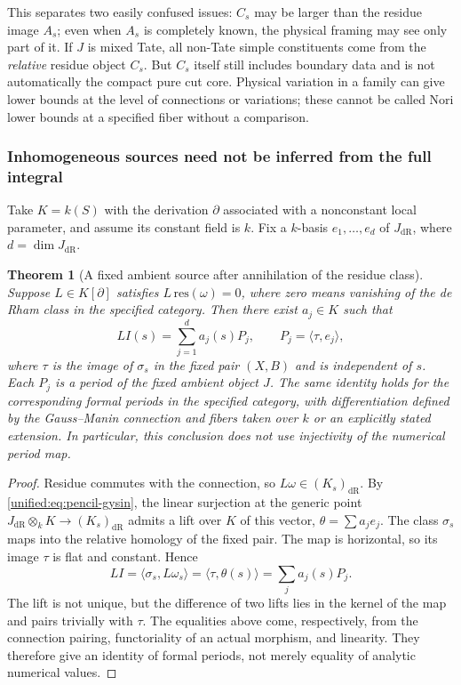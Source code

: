 \documentclass[11pt,a4paper,oneside]{article}
\theoremstyle{plain}
\newtheorem{theorem}{Theorem}[section]
\theoremstyle{definition}
\theoremstyle{remark}
\newcommand{\dR}{\mathrm{dR}}
\numberwithin{equation}{section}
\begin{document}
This separates two easily confused issues: $C_s$ may be larger than the residue image $A_s$;
even when $A_s$ is completely known, the physical framing may see only part of it.
If $J$ is mixed Tate, all non-Tate simple constituents come from the \emph{relative} residue object $C_s$.
But $C_s$ itself still includes boundary data and is not automatically the compact pure cut core.
Physical variation in a family can give lower bounds at the level of connections or variations;
these cannot be called Nori lower bounds at a specified fiber without a comparison.

\subsubsection{Inhomogeneous sources need not be inferred from the full integral}
Take $K=k(S)$ with the derivation $\partial$ associated with a nonconstant local parameter,
and assume its constant field is $k$.
Fix a $k$-basis $e_1,\ldots,e_d$ of $J_{\dR}$, where $d=\dim J_{\dR}$.

\begin{theorem}[A fixed ambient source after annihilation of the residue class]\label{unified:thm:ambient-source}
Suppose $L\in K[\partial]$ satisfies
$L\,\mathrm{res}(\omega)=0$, where zero means vanishing of the de Rham class in the specified category.
Then there exist $a_j\in K$ such that
\begin{equation}\label{unified:eq:ambient-source}
 L I(s)=\sum_{j=1}^d a_j(s)P_j,\qquad
 P_j=\langle\tau,e_j\rangle,
\end{equation}
where $\tau$ is the image of $\sigma_s$ in the fixed pair $(X,B)$ and is independent of $s$.
Each $P_j$ is a period of the fixed ambient object $J$.
The same identity holds for the corresponding formal periods in the specified category,
with differentiation defined by the Gauss--Manin connection and fibers taken over $k$ or an explicitly stated extension.
In particular, this conclusion does not use injectivity of the numerical period map.
\end{theorem}
\begin{proof}
Residue commutes with the connection, so $L\omega\in(K_s)_{\dR}$.
By \eqref{unified:eq:pencil-gysin}, the linear surjection at the generic point
$J_{\dR}\otimes_k K\to(K_s)_{\dR}$ admits a lift over $K$ of this vector,
$\theta=\sum a_je_j$.
The class $\sigma_s$ maps into the relative homology of the fixed pair. The map is horizontal, so its image $\tau$ is flat and constant.
Hence
\[
 LI=\langle\sigma_s,L\omega_s\rangle
   =\langle\tau,\theta(s)\rangle=\sum_j a_j(s)P_j.
\]
The lift is not unique, but the difference of two lifts lies in the kernel of the map and pairs trivially with $\tau$.
The equalities above come, respectively, from the connection pairing, functoriality of an actual morphism, and linearity.
They therefore give an identity of formal periods, not merely equality of analytic numerical values.
\end{proof}
\end{document}
